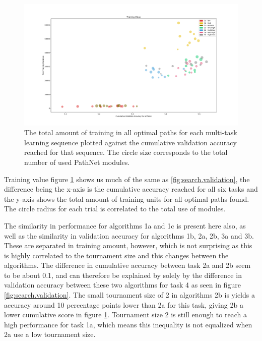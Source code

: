 \begin{figure}[ht]
    \includegraphics[width=1.2\textwidth,center]{Chapters/4.Experiments/exp2/figures/Training_value.pdf}
    \caption{The total amount of training in all optimal paths for each multi-task learning sequence plotted against the cumulative validation accuracy reached for that sequence. The circle size corresponds to the total number of used PathNet modules.}
    \label{fig:search.training_value}
\end{figure}

Training value figure \ref{fig:search.training_value} shows us much of the same as \ref{fig:search.validation}, the difference being the x-axis is the cumulative accuracy reached for all six tasks and the y-axis shows the total amount of training units for all optimal paths found. The circle radius for each trial is correlated to the total use of modules. 

The similarity in performance for algorithms 1a and 1c is present here also, as well as the similarity in validation accuracy for algorithms 1b, 2a, 2b, 3a and 3b. These are separated in training amount, however, which is not surprising as this is highly correlated to the tournament size and this changes between the algorithms. The difference in cumulative accuracy between task 2a and 2b seem to be about 0.1, and can therefore be explained by solely by the difference in validation accuracy between these two algorithms for task 4 as seen in figure \ref{fig:search.validation}. The small tournament size of 2 in algorithms 2b is yields a accuracy around 10 percentage points lower than 2a for this task, giving 2b a lower cumulative score in figure \ref{fig:search.training_value}. Tournament size 2 is still enough to reach a high performance for task 1a, which means this inequality is not equalized when 2a use a low tournament size. 

